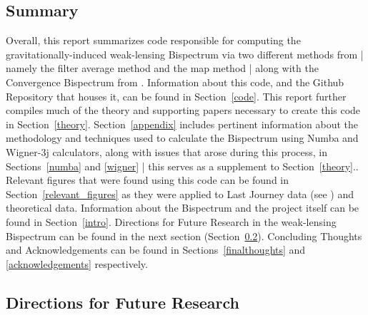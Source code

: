 \documentclass[11pt]{article}
\renewcommand{\_}[1]{\underline{ #1 }}
\begin{document}
{\subsection{Summary}

Overall, this report summarizes code responsible for computing the gravitationally-induced weak-lensing Bispectrum via two different methods from \cite{Munshi_2020} | namely the filter average method and the map method | along with the Convergence Bispectrum from \cite{Namikawa_2019}. Information about this code, and the Github Repository that houses it, can be found in Section~\ref{code}. This report further compiles much of the theory and supporting papers necessary to create this code in Section~\ref{theory}. Section~\ref{appendix} includes pertinent information about the methodology and techniques used to calculate the Bispectrum using Numba and Wigner-3j calculators, along with issues that arose during this process, in Sections~\ref{numba} and \ref{wigner} | this serves as a supplement to Section~\ref{theory}.. Relevant figures that were found using this code can be found in Section~\ref{relevant_figures} as they were applied to Last Journey data (see \cite{Heitmann_2021}) and theoretical data. Information about the Bispectrum and the project itself can be found in Section~\ref{intro}. Directions for Future Research in the weak-lensing Bispectrum can be found in the next section (Section~\ref{future_research}). Concluding Thoughts and Acknowledgements can be found in Sections~\ref{finalthoughts} and \ref{acknowledgements} respectively.

\subsection{Directions for Future Research}\label{future_research}

}
\end{document}
